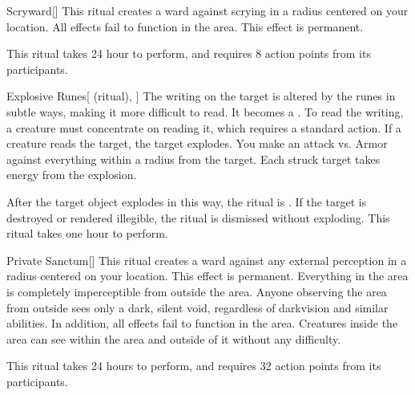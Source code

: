 \lowercase{\hypertarget{spell:Scryward}{}}\label{spell:Scryward}
\begin{apability}[Rank 3]{\hypertarget{spell:Scryward}{Scryward}}[]
\targetrule
This ritual creates a ward against scrying in a \arealarge radius  centered on your location.
All  effects fail to function in the area.
This effect is permanent.

This ritual takes 24 hour to perform, and requires 8 action points from its participants.
\end{apability}
\vspace{0.25em}



\lowercase{\hypertarget{spell:Explosive Runes}{}}\label{spell:Explosive Runes}
\begin{attuneability}[Rank 4]{\hypertarget{spell:Explosive Runes}{Explosive Runes}}[ (ritual), ]
The writing on the target is altered by the runes in subtle ways, making it more difficult to read.
It becomes a .
To read the writing, a creature must concentrate on reading it, which requires a standard action.
If a creature reads the target, the target explodes.
You make an attack vs. Armor against everything within a \areamed radius from the target.
Each struck target takes energy  from the explosion.

After the target object explodes in this way, the ritual is .
If the target is destroyed or rendered illegible, the ritual is dismissed without exploding.
This ritual takes one hour to perform.
\end{attuneability}
\vspace{0.25em}



\lowercase{\hypertarget{spell:Private Sanctum}{}}\label{spell:Private Sanctum}
\begin{apability}[Rank 5]{\hypertarget{spell:Private Sanctum}{Private Sanctum}}[]
\targetrule
This ritual creates a ward against any external perception in a \arealarge radius  centered on your location.
This effect is permanent.
Everything in the area is completely imperceptible from outside the area.
Anyone observing the area from outside sees only a dark, silent void, regardless of darkvision and similar abilities.
In addition, all  effects fail to function in the area.
Creatures inside the area can see within the area and outside of it without any difficulty.

This ritual takes 24 hours to perform, and requires 32 action points from its participants.
\end{apability}
\vspace{0.25em}



